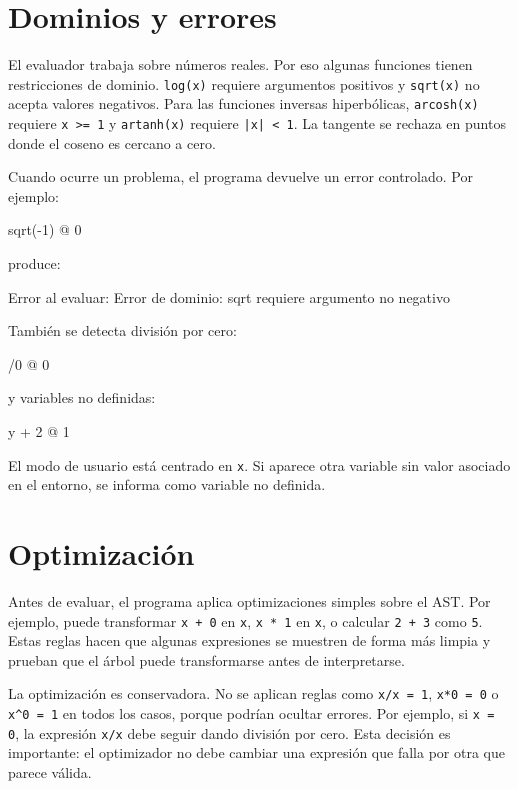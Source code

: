 \documentclass[11pt,a4paper]{article}
\newenvironment{codeblock}{\verbatim}{\endverbatim}
\begin{document}
\section{Dominios y errores}

El evaluador trabaja sobre números reales. Por eso algunas funciones tienen restricciones de dominio. \texttt{log(x)} requiere argumentos positivos y \texttt{sqrt(x)} no acepta valores negativos. Para las funciones inversas hiperbólicas, \texttt{arcosh(x)} requiere \texttt{x >= 1} y \texttt{artanh(x)} requiere \texttt{|x| < 1}. La tangente se rechaza en puntos donde el coseno es cercano a cero.

Cuando ocurre un problema, el programa devuelve un error controlado. Por ejemplo:

\begin{codeblock}
sqrt(-1) @ 0
\end{codeblock}

produce:

\begin{codeblock}
[X] Error al evaluar: Error de dominio: sqrt requiere argumento no negativo
\end{codeblock}

También se detecta división por cero:

\begin{codeblock}
1/0 @ 0
\end{codeblock}

y variables no definidas:

\begin{codeblock}
y + 2 @ 1
\end{codeblock}

El modo de usuario está centrado en \texttt{x}. Si aparece otra variable sin valor asociado en el entorno, se informa como variable no definida.

\section{Optimización}

Antes de evaluar, el programa aplica optimizaciones simples sobre el AST. Por ejemplo, puede transformar \texttt{x + 0} en \texttt{x}, \texttt{x * 1} en \texttt{x}, o calcular \texttt{2 + 3} como \texttt{5}. Estas reglas hacen que algunas expresiones se muestren de forma más limpia y prueban que el árbol puede transformarse antes de interpretarse.

La optimización es conservadora. No se aplican reglas como \texttt{x/x = 1}, \texttt{x*0 = 0} o \texttt{x\^{}0 = 1} en todos los casos, porque podrían ocultar errores. Por ejemplo, si \texttt{x = 0}, la expresión \texttt{x/x} debe seguir dando división por cero. Esta decisión es importante: el optimizador no debe cambiar una expresión que falla por otra que parece válida.
\end{document}
